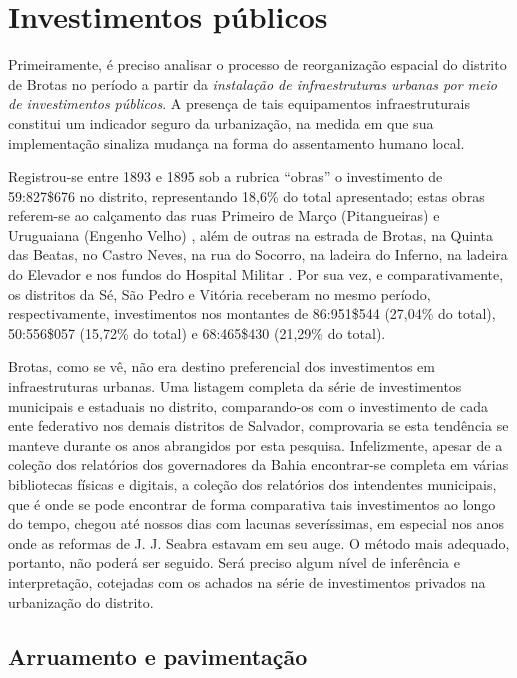 \section{Investimentos públicos}\label{sec:3.1}

Primeiramente, é preciso analisar o processo de reorganização espacial do distrito de Brotas no período a partir da \textit{instalação de infraestruturas urbanas por meio de investimentos públicos}. A presença de tais equipamentos infraestruturais constitui um indicador seguro da urbanização, na medida em que sua implementação sinaliza mudança na forma do assentamento humano local. 

Registrou-se entre 1893 e 1895 sob a rubrica ``obras'' o investimento de 59:827\$676 no distrito, representando 18,6\% do total apresentado;  estas obras referem-se ao calçamento das ruas Primeiro de Março (Pitangueiras) e Uruguaiana (Engenho Velho) \cite[pp.~21-23, 138]{salvador_relatorio_1895}, além de outras na estrada de Brotas, na Quinta das Beatas, no Castro Neves, na rua do Socorro, na ladeira do Inferno, na ladeira do Elevador e nos fundos do Hospital Militar \cite[p.~157]{salvador_relatorio_1894}. Por sua vez, e comparativamente, os distritos da Sé, São Pedro e Vitória receberam no mesmo período, respectivamente, investimentos nos montantes de 86:951\$544 (27,04\% do total), 50:556\$057 (15,72\% do total) e 68:465\$430 (21,29\% do total).

Brotas, como se vê, não era destino preferencial dos investimentos em infraestruturas urbanas. Uma listagem completa da série de investimentos municipais e estaduais no distrito, comparando-os com o investimento de cada ente federativo nos demais distritos de Salvador, comprovaria se esta tendência se manteve durante os anos abrangidos por esta pesquisa. Infelizmente, apesar de a coleção dos relatórios dos governadores da Bahia encontrar-se completa em várias bibliotecas físicas e digitais, a coleção dos relatórios dos intendentes municipais, que é onde se pode encontrar de forma comparativa tais investimentos ao longo do tempo, chegou até nossos dias com lacunas severíssimas, em especial nos anos onde as reformas de J. J. Seabra estavam em seu auge. O método mais adequado, portanto, não poderá ser seguido. Será preciso algum nível de inferência e interpretação, cotejadas com os achados na série de investimentos privados na urbanização do distrito. 

\subsection{Arruamento e pavimentação}

